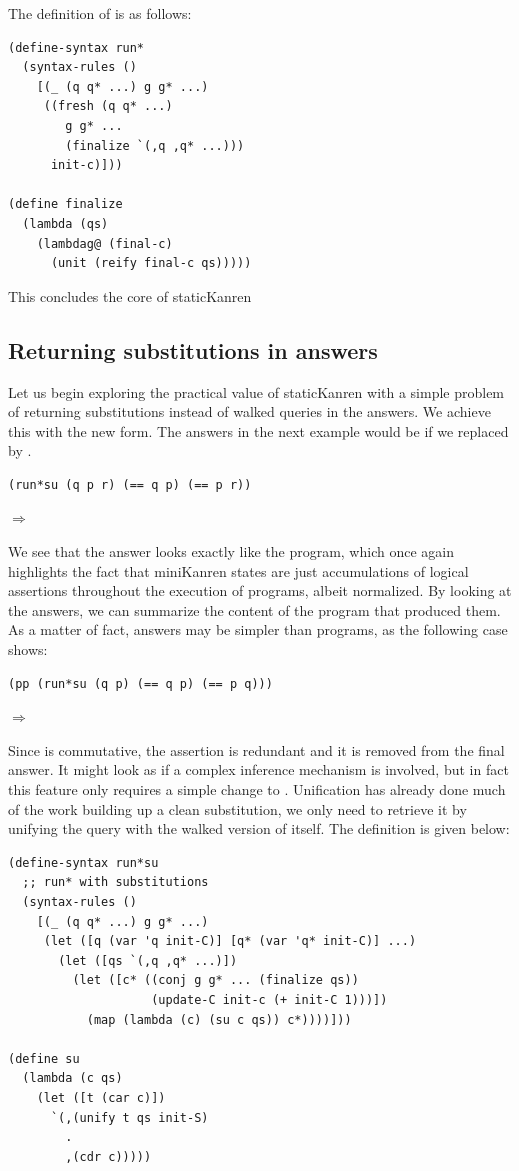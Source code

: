 The definition of  is as follows:
\begin{lstlisting}
(define-syntax run*
  (syntax-rules ()
    [(_ (q q* ...) g g* ...)
     ((fresh (q q* ...)
        g g* ...
        (finalize `(,q ,q* ...)))
      init-c)]))

(define finalize
  (lambda (qs)
    (lambdag@ (final-c)
      (unit (reify final-c qs)))))
\end{lstlisting}
This concludes the core of staticKanren

\subsection{Returning substitutions in answers}\label{S}
Let us begin exploring the practical value of staticKanren with a simple problem of returning substitutions instead of walked queries in the answers. We achieve this with the new  form. The answers in the next example would be  if we replaced  by .
\begin{lstlisting}
(run*su (q p r) (== q p) (== p r))
\end{lstlisting}
$\Rightarrow$ 

We see that the answer looks exactly like the program, which once again highlights the fact that miniKanren states are just accumulations of logical assertions throughout the execution of programs, albeit normalized. By looking at the answers, we can summarize the content of the program that produced them. As a matter of fact, answers may be simpler than programs, as the following case shows:
\begin{lstlisting}
(pp (run*su (q p) (== q p) (== p q)))
\end{lstlisting}
$\Rightarrow$ 

Since \code{==} is commutative, the assertion  is redundant and it is removed from the final answer. It might look as if a complex inference mechanism is involved, but in fact this feature only requires a simple change to . Unification has already done much of the work building up a clean substitution, we only need to retrieve it by unifying the query with the walked version of itself. The definition  is given below:
\begin{lstlisting}
(define-syntax run*su
  ;; run* with substitutions
  (syntax-rules ()
    [(_ (q q* ...) g g* ...)
     (let ([q (var 'q init-C)] [q* (var 'q* init-C)] ...)
       (let ([qs `(,q ,q* ...)])
         (let ([c* ((conj g g* ... (finalize qs))
                    (update-C init-c (+ init-C 1)))])
           (map (lambda (c) (su c qs)) c*))))]))

(define su
  (lambda (c qs)
    (let ([t (car c)])
      `(,(unify t qs init-S)
        .
        ,(cdr c)))))
\end{lstlisting}

